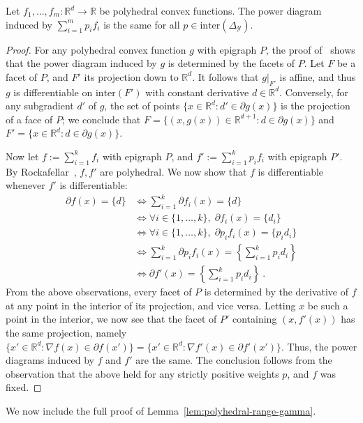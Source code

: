 \documentclass[twoside,11pt]{article}
\newcommand{\reals}{\mathbb{R}}
\newcommand{\simplex}{\Delta_\Y}
\newcommand{\Y}{\mathcal{Y}}
\newcommand{\inter}{\mathrm{inter}}
\begin{document}
\begin{lemma}\label{lem:polyhedral-pd-same}
	Let $f_1,\ldots,f_m:\reals^d\to\reals$ be polyhedral convex functions.
	The power diagram induced by $\sum_{i=1}^m p_i f_i$ is the same for all $p \in \inter(\simplex)$.
\end{lemma}
\begin{proof}
	For any polyhedral convex function $g$ with epigraph $P$, the proof of~\citet[Theorem 4]{aurenhammer1987power} shows that the power diagram induced by $g$ is determined by the facets of $P$.
	Let $F$ be a facet of $P$, and $F'$ its projection down to $\reals^d$.
	It follows that $g|_{F'}$ is affine, and thus $g$ is differentiable on $\inter(F')$ with constant derivative $d\in\reals^d$.
	Conversely, for any subgradient $d'$ of $g$, the set of points $\{x\in\reals^d : d'\in\partial g(x)\}$ is the projection of a face of $P$; we conclude that $F = \{(x,g(x))\in\reals^{d+1} : d\in\partial g(x)\}$ and $F' = \{x\in\reals^d : d\in\partial g(x)\}$.
	
	Now let $f := \sum_{i=1}^k f_i$ with epigraph $P$, and $f' := \sum_{i=1}^k p_i f_i$ with epigraph $P'$.
	By Rockafellar~\cite{rockafellar1997convex}, $f,f'$ are polyhedral.
	We now show that $f$ is differentiable whenever $f'$ is differentiable:
	\begin{align*}
	\partial f(x) = \{d\}
	&\iff \sum_{i=1}^k \partial f_i(x) = \{d\} \\
	&\iff \forall i\in\{1,\ldots,k\}, \; \partial f_i(x) = \{d_i\} \\
	&\iff \forall i\in\{1,\ldots,k\}, \; \partial p_i f_i(x) = \{p_id_i\} \\
	&\iff \sum_{i=1}^k \partial p_if_i(x) = \left\{\sum_{i=1}^k p_id_i\right\} \\
	&\iff \partial f'(x) = \left\{\sum_{i=1}^k p_id_i\right\}~.
	\end{align*}
	From the above observations, every facet of $P$ is determined by the derivative of $f$ at any point in the interior of its projection, and vice versa.
	Letting $x$ be such a point in the interior, we now see that the facet of $P'$ containing $(x,f'(x))$ has the same projection, namely $\{x'\in\reals^d : \nabla f(x) \in \partial f(x')\} = \{x'\in\reals^d : \nabla f'(x) \in \partial f'(x')\}$.
	Thus, the power diagrams induced by $f$ and $f'$ are the same.
	The conclusion follows from the observation that the above held for any strictly positive weights $p$, and $f$ was fixed.
\end{proof}

We now include the full proof of Lemma~\ref{lem:polyhedral-range-gamma}.
\end{document}
